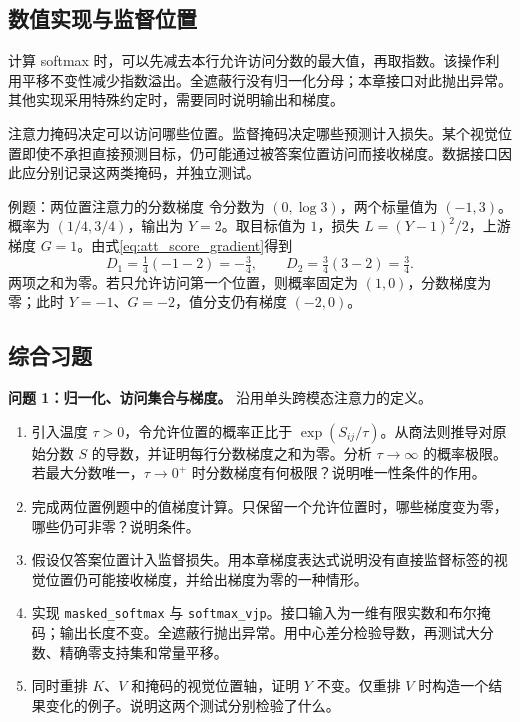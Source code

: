 \subsection{数值实现与监督位置}
计算 softmax 时，可以先减去本行允许访问分数的最大值，再取指数。该操作利用平移不变性减少指数溢出。全遮蔽行没有归一化分母；本章接口对此抛出异常。其他实现采用特殊约定时，需要同时说明输出和梯度。

注意力掩码决定可以访问哪些位置。监督掩码决定哪些预测计入损失。某个视觉位置即使不承担直接预测目标，仍可能通过被答案位置访问而接收梯度。数据接口因此应分别记录这两类掩码，并独立测试。

\begin{worked}{例题：两位置注意力的分数梯度}
令分数为 $(0,\log3)$，两个标量值为 $(-1,3)$。概率为 $(1/4,3/4)$，输出为 $Y=2$。取目标值为 $1$，损失 $L=(Y-1)^2/2$，上游梯度 $G=1$。由式\eqref{eq:att_score_gradient}得到
\begin{equation}\label{eq:att_example}
 D_1=\tfrac14(-1-2)=-\tfrac34,\qquad
 D_2=\tfrac34(3-2)=\tfrac34.
\end{equation}
两项之和为零。若只允许访问第一个位置，则概率固定为 $(1,0)$，分数梯度为零；此时 $Y=-1$、$G=-2$，值分支仍有梯度 $(-2,0)$。
\end{worked}

\subsection{综合习题}\label{prob:attention}
\textbf{问题 1：归一化、访问集合与梯度。} 沿用单头跨模态注意力的定义。
\begin{enumerate}
\item\label{part:att-a} 引入温度 $\tau>0$，令允许位置的概率正比于 $\exp(S_{ij}/\tau)$。从商法则推导对原始分数 $S$ 的导数，并证明每行分数梯度之和为零。分析 $\tau\to\infty$ 的概率极限。若最大分数唯一，$\tau\to0^+$ 时分数梯度有何极限？说明唯一性条件的作用。
\item\label{part:att-b} 完成两位置例题中的值梯度计算。只保留一个允许位置时，哪些梯度变为零，哪些仍可非零？说明条件。
\item\label{part:att-c} 假设仅答案位置计入监督损失。用本章梯度表达式说明没有直接监督标签的视觉位置仍可能接收梯度，并给出梯度为零的一种情形。
\item\label{part:att-d} 实现 \texttt{masked\_softmax} 与 \texttt{softmax\_vjp}。接口输入为一维有限实数和布尔掩码；输出长度不变。全遮蔽行抛出异常。用中心差分检验导数，再测试大分数、精确零支持集和常量平移。
\item\label{part:att-e} 同时重排 $K$、$V$ 和掩码的视觉位置轴，证明 $Y$ 不变。仅重排 $V$ 时构造一个结果变化的例子。说明这两个测试分别检验了什么。
\end{enumerate}
